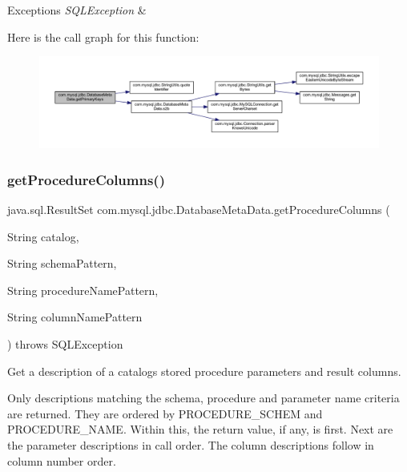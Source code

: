 \begin{DoxyExceptions}{Exceptions}
{\em S\+Q\+L\+Exception} & \\
\hline
\end{DoxyExceptions}
Here is the call graph for this function\+:\nopagebreak
\begin{figure}[H]
\begin{center}
\leavevmode
\includegraphics[width=350pt]{classcom_1_1mysql_1_1jdbc_1_1_database_meta_data_a46c186ab0bcdea0569100f0147339544_cgraph}
\end{center}
\end{figure}
\mbox{\label{classcom_1_1mysql_1_1jdbc_1_1_database_meta_data_ae2d34b7a6ae33efa59382465aaa01f58}} 
\subsubsection{\texorpdfstring{get\+Procedure\+Columns()}{getProcedureColumns()}}
{\footnotesize\ttfamily java.\+sql.\+Result\+Set com.\+mysql.\+jdbc.\+Database\+Meta\+Data.\+get\+Procedure\+Columns (\begin{DoxyParamCaption}\item[{String}]{catalog,  }\item[{String}]{schema\+Pattern,  }\item[{String}]{procedure\+Name\+Pattern,  }\item[{String}]{column\+Name\+Pattern }\end{DoxyParamCaption}) throws S\+Q\+L\+Exception}

Get a description of a catalog\textquotesingle{}s stored procedure parameters and result columns. 

Only descriptions matching the schema, procedure and parameter name criteria are returned. They are ordered by P\+R\+O\+C\+E\+D\+U\+R\+E\+\_\+\+S\+C\+H\+EM and P\+R\+O\+C\+E\+D\+U\+R\+E\+\_\+\+N\+A\+ME. Within this, the return value, if any, is first. Next are the parameter descriptions in call order. The column descriptions follow in column number order. 

